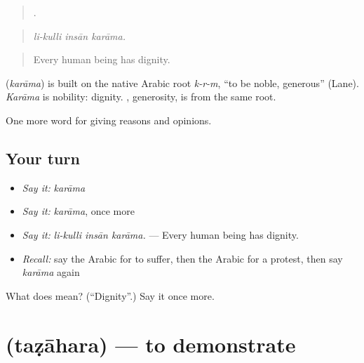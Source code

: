 \begin{quote}
  .
\end{quote}

\begin{quote}
\emph{li-kulli insān karāma.}
\end{quote}

\begin{quote}
Every human being has dignity.
\end{quote}

\begin{cousinweb}
\textbf{} (\emph{karāma}) is built on the native Arabic root \emph{k-r-m}, \textquotedblleft{}to be noble, generous\textquotedblright{} (Lane). \emph{Karāma} is nobility: dignity. , generosity, is from the same root.
\end{cousinweb}

\begin{grammarlens}[title={What you've built}]
One more word for giving reasons and opinions.
\end{grammarlens}

\subsection*{Your turn}
\begin{itemize}
\raggedright
  \item \emph{Say it:} \emph{karāma}
  \item \emph{Say it:} \emph{karāma}, once more
  \item \emph{Say it:} \emph{li-kulli insān karāma.} — Every human being has dignity.
  \item \emph{Recall:} say the Arabic for to suffer, then the Arabic for a protest, then say \emph{karāma} again
\end{itemize}

\begin{tcolorbox}[breakable,colback=teal!4,colframe=teal!35!black,title={Before you move on}]
What does  mean? (\textquotedblleft{}Dignity\textquotedblright{}.) Say it once more.
\end{tcolorbox}
\section[\texorpdfstring{\ar{تظاهر} (taẓāhara)}{تظاهر (taẓāhara)}]{ (taẓāhara) — to demonstrate}

\label{lesson:AR-C382-tazahara}



